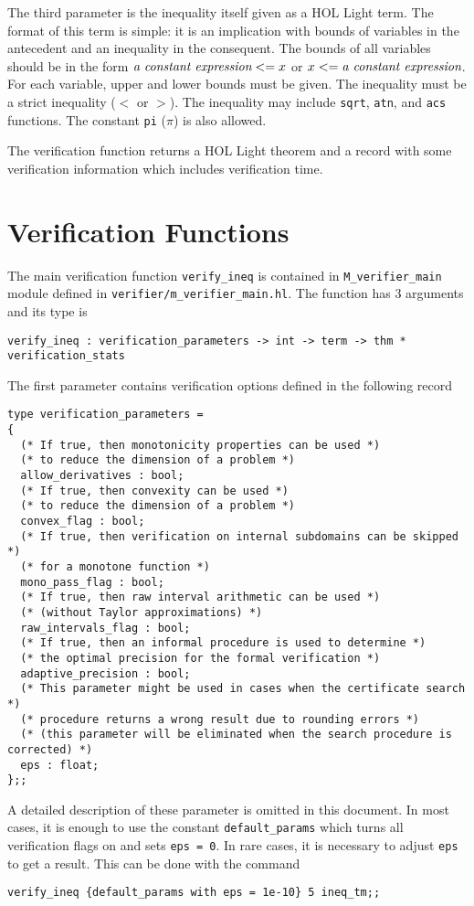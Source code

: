 \documentclass[a4paper]{article}
\begin{document}
The third parameter is the inequality itself given as a HOL Light term. The format of this term is simple: it is an implication with bounds of variables in the antecedent and an inequality in the consequent. The bounds of all variables should be in the form $\text{\it a constant expression} <= x$ or $x <= \text{\it a constant expression}$. For each variable, upper and lower bounds must be given. The inequality must be a strict inequality ($<$ or $>$). The inequality may include \verb|sqrt|, \verb|atn|, and \verb|acs| functions. The constant \verb|pi| ($\pi$) is also allowed.

The verification function returns a HOL Light theorem and a record with some verification information which includes verification time.


\section{Verification Functions}\label{verification}
The main verification function \verb|verify_ineq| is contained in \verb|M_verifier_main| module defined in \verb|verifier/m_verifier_main.hl|. The function has 3 arguments and its type is
\begin{verbatim}
verify_ineq : verification_parameters -> int -> term -> thm * verification_stats
\end{verbatim}

The first parameter contains verification options defined in the following record
\begin{verbatim}
type verification_parameters =
{
  (* If true, then monotonicity properties can be used *)
  (* to reduce the dimension of a problem *)
  allow_derivatives : bool;
  (* If true, then convexity can be used *)
  (* to reduce the dimension of a problem *)
  convex_flag : bool;
  (* If true, then verification on internal subdomains can be skipped *)
  (* for a monotone function *)
  mono_pass_flag : bool;
  (* If true, then raw interval arithmetic can be used *)
  (* (without Taylor approximations) *)
  raw_intervals_flag : bool;
  (* If true, then an informal procedure is used to determine *)
  (* the optimal precision for the formal verification *)
  adaptive_precision : bool;
  (* This parameter might be used in cases when the certificate search *)
  (* procedure returns a wrong result due to rounding errors *)
  (* (this parameter will be eliminated when the search procedure is corrected) *)
  eps : float;
};;
\end{verbatim}
A detailed description of these parameter is omitted in this document. In most cases, it is enough to use the constant \verb|default_params| which turns all verification flags on and sets \verb|eps = 0|. In rare cases, it is necessary to adjust \verb|eps| to get a result. This can be done with the command
\begin{verbatim}
verify_ineq {default_params with eps = 1e-10} 5 ineq_tm;;
\end{verbatim}
\end{document}
